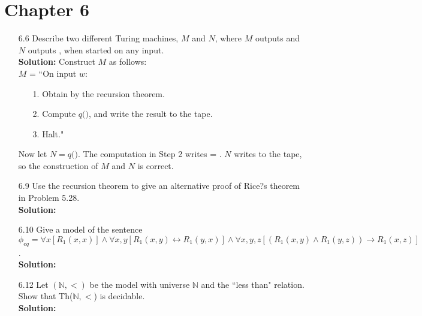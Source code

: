 \section{Chapter 6}
\begin{enumerate}
\item[6.6]Describe two different Turing machines, $M$ and $N$, where $M$ outputs  and $N$ outputs , when started on any input.
\\
\textbf{Solution:} Construct $M$ as follows:
\\
$M$ = ``On input $w$:
\begin{enumerate}
\itemsep0em
\item[1.]Obtain  by the recursion theorem.
\item[2.]Compute $q($$)$, and write the result to the tape.
\item[3.]Halt."
\end{enumerate}
Now let $N = q($$)$. The computation in Step 2 writes  = . $N$ writes  to the tape, so the construction of $M$ and $N$ is correct.

\item[6.9]Use the recursion theorem to give an alternative proof of Rice?s theorem in Problem 5.28.
\\
\textbf{Solution:} \alreadyanswered

\item[6.10]Give a model of the sentence $\phi_{eq} = \forall x [R_1(x, x)] \wedge \forall x, y [R_1(x, y) \leftrightarrow R_1(y, x)] \wedge \forall x, y, z [(R_1(x, y) \wedge R_1(y, z)) \to R_1(x, z)]$.
\\
\textbf{Solution:} \alreadyanswered

\item[6.12]Let $(\mathbb{N} , <)$ be the model with universe $\mathbb{N}$ and the ``less than" relation. Show that Th($\mathbb{N} , <$) is decidable.
\\
\textbf{Solution:} \alreadyanswered


\end{enumerate}
